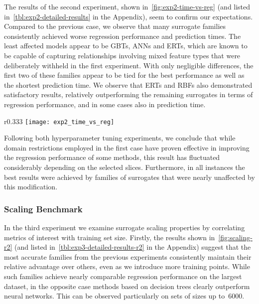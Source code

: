 The results of the second experiment, shown in~\cref{fig:exp2-time-vs-reg} (and listed
in~\cref{tbl:exp2-detailed-results} in the Appendix),
seem to confirm our expectations. Compared to the previous case, we observe
that many surrogate families consistently achieved worse regression
performance and prediction times. The least
affected models appear to be GBTs, ANNs and ERTs, which are known to be capable of capturing relationships
involving mixed feature types that were deliberately withheld in the first
experiment. With only negligible differences, the first two of these families
appear to be tied for the best performance as well as the shortest prediction
time. We observe that ERTs and RBFs also
demonstrated satisfactory results, relatively outperforming the remaining surrogates in
terms of regression performance, and in some cases also in prediction time.

\begin{wrapfigure}[10]{r}{0.333\textwidth}
	\centering
	\vspace{-2ex}
	\texttt{[image: exp2\_time\_vs\_reg]}
	\caption{Results of experiment~2, plotted analogously
	to~\cref{fig:exp1-time-vs-reg}.}
	\label{fig:exp2-time-vs-reg}
\end{wrapfigure}

Following both hyperparameter tuning experiments, we conclude that while domain
restrictions employed in the first case have proven effective in improving the
regression performance of some methods, this result has fluctuated considerably
depending on the selected slices. Furthermore, in all instances the best
results were achieved by families of surrogates that were nearly unaffected by
this modification.


\subsubsection{Scaling Benchmark}

In the third experiment we examine surrogate scaling properties by correlating
metrics of interest with training set size. Firstly, the results shown 
in~\cref{fig:scaling-r2} (and listed in~\cref{tbl:exp3-detailed-results-r2} in
the Appendix) suggest that the most accurate families from the previous experiments
consistently maintain their relative advantage over others, even as we introduce
more training points. While such families achieve nearly comparable regression
performance on the largest dataset, in the opposite case methods based on
decision trees clearly outperform neural networks. This can be observed
particularly on sets of sizes up to~\num{6000}.


